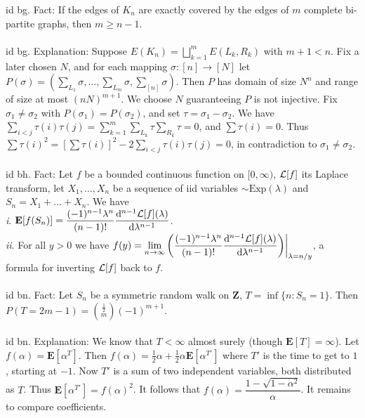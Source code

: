 \documentclass[oneside]{book}
\newcommand{\Z}{\mathbf{Z}}
\newcommand{\E}{\mathbf{E}}
\newcommand{\set}[1]{\{ #1\}}
\newcommand{\fit}[1]{\left( #1\right)}
\renewcommand{\d}{\mathrm{d}}
\newcommand{\Exp}{\mathrm{Exp}}
\renewcommand{\i}{{\it i}. }
\newcommand{\ii}{{\it ii}. }
\begin{document}
id bg. Fact: If the edges of $K_n$ are exactly covered by the edges of $m$ complete bi-partite graphs, then $m\ge n-1$.    \\\\


id bg. Explanation: Suppose $E(K_n)=\bigsqcup_{k=1}^m E(L_k,R_k)$ with $m+1<n$. Fix a later chosen $N$, and for each mapping $\sigma:[n]\to [N]$ let $P(\sigma)=(\sum_{L_1}\sigma,\dots,\sum_{L_m}\sigma,\sum_{[n]}\sigma)$. Then $P$ has domain of size $N^n$ and range of size at most $(nN)^{m+1}$. We choose $N$ guaranteeing $P$ is not injective. Fix $\sigma_1\neq\sigma_2$ with $P(\sigma_1)=P(\sigma_2)$, and set $\tau=\sigma_1-\sigma_2$. We have $\sum_{i<j}\tau(i)\tau(j)=\sum_{k=1}^m \sum_{L_k}\tau\sum_{R_k}\tau=0$, and $\sum\tau(i)=0$. Thus $\sum\tau(i)^2=[\sum\tau(i)]^2-2\sum_{i<j}\tau(i)\tau(j)=0$, in contradiction to $\sigma_1\neq\sigma_2$. \\\\


id bh. Fact: Let $f$ be a bounded continuous function on $[0,\infty)$, $\mathcal{L}[f]$ its Laplace transform, let $X_1,\dots,X_n$ be a sequence of iid variables $\sim\Exp(\lambda)$ and $S_n=X_1+\dots+X_n$. We have \\
\i $\E[f(S_n)]=\dfrac{(-1)^{n-1}\lambda^n}{(n-1)!}\dfrac{\d^{n-1} \LL[f](\lambda)}{\d \lambda^{n-1}}$.\\
\ii For all $y>0$ we have $f(y)=\displaystyle\lim_{n\to\infty} \fit{\dfrac{(-1)^{n-1}\lambda^n}{(n-1)!}\dfrac{\d^{n-1} \LL[f](\lambda)}{\d \lambda^{n-1}}}\biggr\rvert_{\lambda=n/y}$, a formula for inverting $\mathcal{L}[f]$ back to $f$.    \\\\


id bn. Fact: Let $S_n$ be a symmetric random walk on $\Z$, $T=\inf\set{n:S_n=1}$. Then $P(T=2m-1)=\displaystyle\binom{\frac{1}{2}}{m}(-1)^{m+1}$. \\\\


id bn. Explanation: We know that $T<\infty$ almost surely (though $\E[T]=\infty$). Let $f(\alpha)=\E[\alpha^T]$. Then $f(\alpha)=\frac{1}{2}\alpha+\frac{1}{2}\alpha \E[\alpha^{T'}]$ where $T'$ is the time to get to $1$, starting at $-1$. Now $T'$ is a sum of two independent variables, both distributed as $T$. Thus $\E[\alpha^{T'}]=f(\alpha)^2$. It follows that $f(\alpha)=\dfrac{1-\sqrt{1-\alpha^2}}{\alpha}$. It remains to compare coefficients. \\\\
\end{document}
